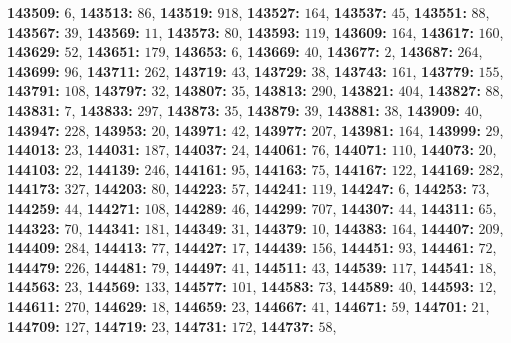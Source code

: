 \textsf{\bfseries 143509:} $6$, \textsf{\bfseries 143513:} $86$, \textsf{\bfseries 143519:} $918$, \textsf{\bfseries 143527:} $164$, \textsf{\bfseries 143537:} $45$, \textsf{\bfseries 143551:} $88$, \textsf{\bfseries 143567:} $39$, \textsf{\bfseries 143569:} $11$, \textsf{\bfseries 143573:} $80$, \textsf{\bfseries 143593:} $119$, \textsf{\bfseries 143609:} $164$, \textsf{\bfseries 143617:} $160$, \textsf{\bfseries 143629:} $52$, \textsf{\bfseries 143651:} $179$, \textsf{\bfseries 143653:} $6$, \textsf{\bfseries 143669:} $40$, \textsf{\bfseries 143677:} $2$, \textsf{\bfseries 143687:} $264$, \textsf{\bfseries 143699:} $96$, \textsf{\bfseries 143711:} $262$, \textsf{\bfseries 143719:} $43$, \textsf{\bfseries 143729:} $38$, \textsf{\bfseries 143743:} $161$, \textsf{\bfseries 143779:} $155$, \textsf{\bfseries 143791:} $108$, \textsf{\bfseries 143797:} $32$, \textsf{\bfseries 143807:} $35$, \textsf{\bfseries 143813:} $290$, \textsf{\bfseries 143821:} $404$, \textsf{\bfseries 143827:} $88$, \textsf{\bfseries 143831:} $7$, \textsf{\bfseries 143833:} $297$, \textsf{\bfseries 143873:} $35$, \textsf{\bfseries 143879:} $39$, \textsf{\bfseries 143881:} $38$, \textsf{\bfseries 143909:} $40$, \textsf{\bfseries 143947:} $228$, \textsf{\bfseries 143953:} $20$, \textsf{\bfseries 143971:} $42$, \textsf{\bfseries 143977:} $207$, \textsf{\bfseries 143981:} $164$, \textsf{\bfseries 143999:} $29$, \textsf{\bfseries 144013:} $23$, \textsf{\bfseries 144031:} $187$, \textsf{\bfseries 144037:} $24$, \textsf{\bfseries 144061:} $76$, \textsf{\bfseries 144071:} $110$, \textsf{\bfseries 144073:} $20$, \textsf{\bfseries 144103:} $22$, \textsf{\bfseries 144139:} $246$, \textsf{\bfseries 144161:} $95$, \textsf{\bfseries 144163:} $75$, \textsf{\bfseries 144167:} $122$, \textsf{\bfseries 144169:} $282$, \textsf{\bfseries 144173:} $327$, \textsf{\bfseries 144203:} $80$, \textsf{\bfseries 144223:} $57$, \textsf{\bfseries 144241:} $119$, \textsf{\bfseries 144247:} $6$, \textsf{\bfseries 144253:} $73$, \textsf{\bfseries 144259:} $44$, \textsf{\bfseries 144271:} $108$, \textsf{\bfseries 144289:} $46$, \textsf{\bfseries 144299:} $707$, \textsf{\bfseries 144307:} $44$, \textsf{\bfseries 144311:} $65$, \textsf{\bfseries 144323:} $70$, \textsf{\bfseries 144341:} $181$, \textsf{\bfseries 144349:} $31$, \textsf{\bfseries 144379:} $10$, \textsf{\bfseries 144383:} $164$, \textsf{\bfseries 144407:} $209$, \textsf{\bfseries 144409:} $284$, \textsf{\bfseries 144413:} $77$, \textsf{\bfseries 144427:} $17$, \textsf{\bfseries 144439:} $156$, \textsf{\bfseries 144451:} $93$, \textsf{\bfseries 144461:} $72$, \textsf{\bfseries 144479:} $226$, \textsf{\bfseries 144481:} $79$, \textsf{\bfseries 144497:} $41$, \textsf{\bfseries 144511:} $43$, \textsf{\bfseries 144539:} $117$, \textsf{\bfseries 144541:} $18$, \textsf{\bfseries 144563:} $23$, \textsf{\bfseries 144569:} $133$, \textsf{\bfseries 144577:} $101$, \textsf{\bfseries 144583:} $73$, \textsf{\bfseries 144589:} $40$, \textsf{\bfseries 144593:} $12$, \textsf{\bfseries 144611:} $270$, \textsf{\bfseries 144629:} $18$, \textsf{\bfseries 144659:} $23$, \textsf{\bfseries 144667:} $41$, \textsf{\bfseries 144671:} $59$, \textsf{\bfseries 144701:} $21$, \textsf{\bfseries 144709:} $127$, \textsf{\bfseries 144719:} $23$, \textsf{\bfseries 144731:} $172$, \textsf{\bfseries 144737:} $58$, 
